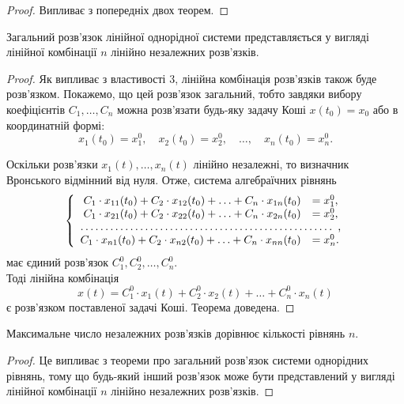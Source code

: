 \begin{proof}
	Випливає з попередніх двох теорем.
\end{proof}

\begin{theorem}
	Загальний розв'язок лінійної однорідної системи представляється у вигляді лінійної комбінації $n$ лінійно незалежних роз\-в'яз\-ків.
\end{theorem}

\begin{proof}
	Як випливає з властивості 3, лінійна комбінація розв'язків також буде розв'язком. Покажемо, що цей розв'язок загальний, тобто завдяки вибору коефіцієнтів $C_1, \ldots, C_n$ можна розв'язати будь-яку задачу Коші $x(t_0) = x_0$ або в координатній формі:
	\begin{equation*}
		x_1(t_0) = x_1^0, \quad x_2(t_0) = x_2^0, \quad \ldots, \quad x_n(t_0) = x_n^0.
	\end{equation*}

	Оскільки розв'язки $x_1(t), \ldots, x_n(t)$  лінійно незалежні, то визначник Вронського відмінний від нуля. Отже, система алгебраїчних рівнянь
	\begin{equation*}
		\left\{
			\begin{array}{rl}
				C_1 \cdot x_{11}(t_0) + C_2 \cdot x_{12}(t_0) + \ldots + C_n \cdot x_{1n}(t_0) &= x_1^0, \\
				C_1 \cdot x_{21}(t_0) + C_2 \cdot x_{22}(t_0) + \ldots + C_n \cdot x_{2n}(t_0) &= x_2^0, \\
				\hdotsfor{2}, \\
				C_1 \cdot x_{n1}(t_0) + C_2 \cdot x_{n2}(t_0) + \ldots + C_n \cdot x_{nn}(t_0) &= x_n^0.
			\end{array}
		\right.
	\end{equation*}
	має єдиний розв'язок $C_1^0, C_2^0, \ldots, C_n^0$. \\

	Тоді лінійна комбінація
	\begin{equation*}
		x(t) = C_1^0 \cdot x_1(t) + C_2^0 \cdot x_2(t) + \ldots + C_n^0 \cdot x_n(t)
	\end{equation*}
	є розв'язком поставленої задачі Коші. Теорема доведена.
\end{proof}

\begin{remark}
	Максимальне число незалежних розв'язків дорівнює кількості рівнянь $n$.
\end{remark}

\begin{proof}
	Це випливає з теореми про загальний розв'язок системи однорідних рівнянь, тому що будь-який інший розв'язок може бути представлений у вигляді лінійної комбінації $n$ лінійно незалежних розв'язків.
\end{proof}

